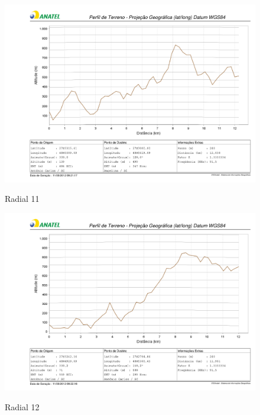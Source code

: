 \begin{figure}[ht] %
\begin{center}
\includegraphics[scale=.5]{./figuras/nmt11_v2.pdf} %

Radial 11
\end{center}
\label{nmt11}
\end{figure}

\begin{figure}[ht] %
\begin{center}
\includegraphics[scale=.5]{./figuras/nmt12_v2.pdf} %

Radial 12
\end{center}
\label{nmt12}
\end{figure}

